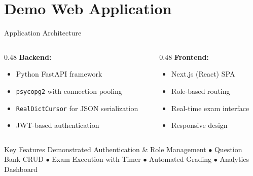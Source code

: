 \documentclass[aspectratio=169, 10pt]{beamer}
\begin{document}
\section{Demo Web Application}

\begin{frame}{Application Architecture}
    \begin{columns}[T]
        \begin{column}{0.48\textwidth}
            \textbf{Backend:}
            \begin{itemize}
                \item Python FastAPI framework
                \item \texttt{psycopg2} with connection pooling
                \item \texttt{RealDictCursor} for JSON serialization
                \item JWT-based authentication
            \end{itemize}
        \end{column}
        \begin{column}{0.48\textwidth}
            \textbf{Frontend:}
            \begin{itemize}
                \item Next.js (React) SPA
                \item Role-based routing
                \item Real-time exam interface
                \item Responsive design
            \end{itemize}
        \end{column}
    \end{columns}
    \vspace{0.4cm}
    \begin{block}{Key Features Demonstrated}
        Authentication \& Role Management $\bullet$ Question Bank CRUD $\bullet$ Exam Execution with Timer $\bullet$ Automated Grading $\bullet$ Analytics Dashboard
    \end{block}
\end{frame}
\end{document}
